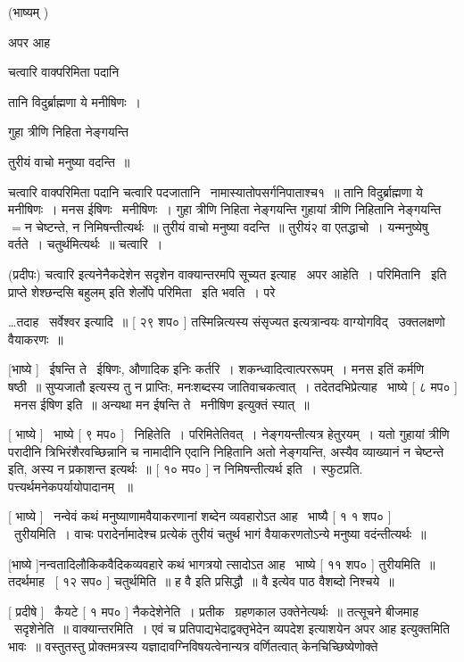 \documentclass[11pt, openany]{book}
\begin{document}
 (भाष्यम् ) 

अपर आह \textendash\ 

चत्वारि वाक्परिमिता पदानि 

तानि विदुर्ब्राह्मणा ये मनीषिणः~। 

गुहा त्रीणि निहिता नेङ्गयन्ति 

तुरीयं वाचो मनुष्या वदन्ति~॥ 

{\qt चत्वारि वाक्परिमिता पदानि} चत्वारि
पदजातानि \textendash\ नामास्यातोपसर्गनिपाताश्च१~॥ {\qt तानि विदुर्ब्राह्मणा ये मनीषिणः~।} 
मनस ईषिणः \textendash\ मनीषिणः~। {\qt गुहा त्रीणि निहिता नेङ्गयन्ति} गुहायां त्रीणि
निहितानि नेङ्गयन्ति $=$न चेष्टन्ते, न निमिषन्तीत्यर्थः~॥ {\qt तुरीयं वाचो}
मनुष्या वदन्ति~॥ तुरीयं२ वा एतद्धाचो~। यन्मनुष्येषु वर्तते~। 
चतुर्थमित्यर्थः~॥ चत्वारि~। 

 (प्रदीपः) {\qt चत्वारि} इत्यनेनैकदेशेन सदृशेन वाक्यान्तरमपि सूच्यत
इत्याह \textendash\ अपर आहेति~। परिमितानि \textendash\ इति प्राप्ते {\qt शेश्छन्दसि बहुलम्} इति
शेर्लोपे परिमिता \textendash\ इति भवति~। परे \textendash\ 



\ldots तदाह \textendash\ सर्वेश्वर इत्यादि~॥ [ २९ शप० ] तस्मिन्नित्यस्य
संसृज्यत इत्यत्रान्वयः वाग्योगविद् \textendash\ उक्तलक्षणो वैयाकरणः~॥ 

 [भाष्ये ] \textendash\ ईषन्ति ते \textendash\ ईषिणः, औणादिक इनिः कर्तरि~। 
शकन्ध्वादित्वात्पररूपम्~। मनस इतिं कर्मणि षष्ठी~॥ {\qt सुप्यजातौ} इत्यस्य
तु न प्राप्तिः, मनःशब्दस्य जातिवाचकत्वात्~। तदेतदभिप्रेत्याह \textendash\ भाष्ये [
८ मप० ] \textendash\ मनस ईषिण इति~॥ अन्यथा मन ईषन्ति ते \textendash\ मनीषिण इत्युक्तं स्यात्~॥


 [ भाष्ये ] \textendash\ भाष्ये [ ९ मप० ] \textendash\ निहितेति~। परिमितेतिवत्~। 
नेङ्गयन्तीत्यत्र हेतुरयम्~। यतो गुहायां त्रीणि परादीनि
त्रिभिरंशैरवच्छिन्नानि च नामादीनि एदानि निहितानि अतो नेङ्गयन्ति, अस्यैव
व्याख्यानं {\qt न चेष्टन्ते} इति, अस्य न प्रकाशन्त इत्यर्थः~॥ [ १०
मप० ] न निमिषन्तीत्यर्थ इति~। स्फुटप्रति. पत्त्यर्थमनेकपर्यायोपादानम्
~॥ 

 [ भाष्ये ] \textendash\ नन्वेवं कथं मनुष्याणामवैयाकरणानां शब्देन व्यवहारोऽत
आह \textendash\ भाष्यै [ १ १ शप० ] \textendash\ तुरीयमिति~। वाचः परादेर्नामादेश्च
प्रत्येकं तुरीयं चतुर्थ भागं वैयाकरणतोऽन्ये मनुष्या वदंन्तीत्यर्थः~॥ 

 [भाष्ये ]नन्वतादिलौकिकवैदिकव्यवहारे कथं भागत्रयो त्सादोऽत
आह \textendash\ भाष्ये [ ११ शप० ] तुरीयमिति~॥ तदर्थमाह \textendash\ [ १२ सप० ]
चतुर्थमिति~॥ ह वै इति प्रसिद्धौ~॥ वै इत्येव पाठ वैशब्दो निश्चये~॥


 [ प्रदीषे ] \textendash\ कैयटे [ १ मप० ] नैकदेशेनेति~। प्रतीक \textendash\ ग्रहणकाल
उक्तेनेत्यर्थः~॥ तत्सूचने बीजमाह \textendash\ सदृशेनेति~॥ वाक्यान्तरमिति~। एवं
च प्रतिपाद्यभेदाद्वक्तृभेदेन व्यपदेश इत्याशयेन {\qt अपर आह} इत्युक्तमिति
भावः~॥ वस्तुतस्तु प्रोक्तमत्रस्य यज्ञादावग्निविषयत्वेनान्यत्र
वर्णितत्वात् केनचिच्छिष्येणोक्ते 
\end{document}
